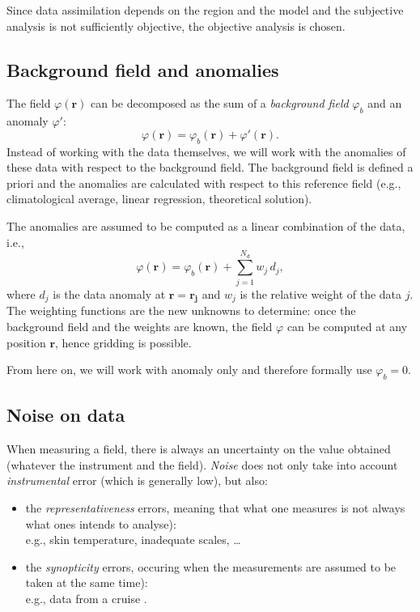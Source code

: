 Since data assimilation depends on the region and the model and the subjective analysis is not sufficiently objective, the objective analysis is chosen. 

\subsection{Background field and anomalies}

The field $\varphi(\mathbf{r})$ can be decomposed as the sum of a \textit{background field}  $\varphi_b$ and an anomaly $\varphi'$: 
\begin{equation}
 \varphi(\mathbf{r}) = \varphi_b(\mathbf{r}) + \varphi'(\mathbf{r}).
 \label{background}
\end{equation}
Instead of working with the data themselves, we will work with the anomalies of these data with respect to the background field. The background field is defined a priori and the anomalies are calculated with respect to this reference field (e.g., climatological average, linear regression, theoretical solution). 

The anomalies are assumed to be computed as a linear combination of the data, i.e., 
\begin{equation}
\varphi(\mathbf{r}) = \varphi_b(\mathbf{r}) + \sum_{j=1}^{N_d} w_j\, d_j,
\label{objectiveanal}
\end{equation}
where $d_{j}$ is the data anomaly at $\mathbf{r}= \mathbf{r_{j}}$ and $w_j$ is the relative weight of the data $j$. The weighting functions are the new unknowns to determine: once the background field and the weights are known, the field $\varphi$ can be computed at any position $\mathbf{r}$, hence gridding is possible.

From here on, we will work with anomaly only and therefore formally use $\varphi_{b}=0$.

\subsection{Noise on data}

When measuring a field, there is always an uncertainty on the value obtained (whatever the instrument and the field). \textit{Noise}  does not only take into account \textit{instrumental} error (which is generally low), but also:
\begin{itemize}
\item the \textit{representativeness} errors, meaning that what one measures is not always what ones intends to analyse):\\
e.g., skin temperature, inadequate scales, \ldots
\item the \textit{synopticity} errors, occuring when the measurements are assumed to be taken at the same time):\\
e.g., data from a cruise \citep{RIXEN01}.
\end{itemize}

